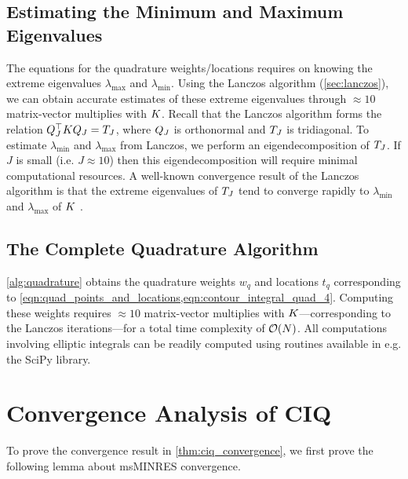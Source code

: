 \subsection{Estimating the Minimum and Maximum Eigenvalues}
The equations for the quadrature weights/locations requires on knowing the extreme eigenvalues $\lambda_\text{max}$ and $\lambda_\text{min}$.
Using the Lanczos algorithm (\cref{sec:lanczos}), we can obtain accurate estimates of these extreme eigenvalues through $\approx 10$ matrix-vector multiplies with $K$.
Recall that the Lanczos algorithm forms the relation $Q^\top_J K Q_J = T_J$, where $Q_J$ is orthonormal and $T_J$ is tridiagonal.
To estimate $\lambda_\text{min}$ and $\lambda_\text{max}$ from Lanczos, we perform an eigendecomposition of $T_J$.
If $J$ is small (i.e. $J \approx 10$) then this eigendecomposition will require minimal computational resources.
A well-known convergence result of the Lanczos algorithm is that the extreme eigenvalues of $T_J$ tend to converge rapidly to $\lambda_\text{min}$ and $\lambda_\text{max}$ of $K$ \citep[e.g.][]{saad2003iterative,golub2012matrix}.


\subsection{The Complete Quadrature Algorithm}
\cref{alg:quadrature} obtains the quadrature weights $w_q$ and locations $t_q$ corresponding to \cref{eqn:quad_points_and_locations,eqn:contour_integral_quad_4}.
Computing these weights requires $\approx 10$ matrix-vector multiplies with $K$---corresponding to the Lanczos iterations---for a total time complexity of $\bigo{N}$.
All computations involving elliptic integrals can be readily computed using routines available in e.g. the SciPy library.



\section{Convergence Analysis of CIQ}

To prove the convergence result in \cref{thm:ciq_convergence}, we first prove the following lemma about msMINRES convergence.

